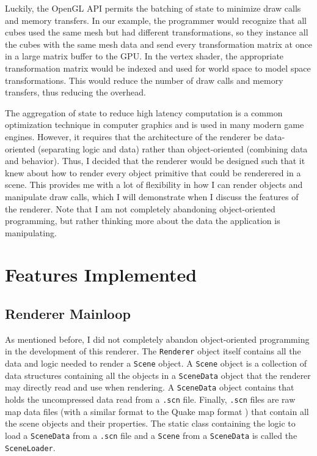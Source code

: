 \documentclass[letterpaper, 10 pt, conference]{ieeeconf}  %
\begin{document}
Luckily, the OpenGL API permits the batching of state to minimize draw calls and memory transfers. In our example, the programmer would recognize that all cubes used the same mesh but had different transformations, so they instance all the cubes with the same mesh data and send every transformation matrix at once in a large matrix buffer to the GPU. In the vertex shader, the appropriate transformation matrix would be indexed and used for world space to model space transformations. This would reduce the number of draw calls and memory transfers, thus reducing the overhead.

The aggregation of state to reduce high latency computation is a common optimization technique in computer graphics and is used in many modern game engines. However, it requires that the architecture of the renderer be data-oriented (separating logic and data) rather than object-oriented (combining data and behavior). Thus, I decided that the renderer would be designed such that it knew about how to render every object primitive that could be renderered in a scene. This provides me with a lot of flexibility in how I can render objects and manipulate draw calls, which I will demonstrate when I discuss the features of the renderer. Note that I am not completely abandoning object-oriented programming, but rather thinking more about the data the application is manipulating. 


\section{Features Implemented}

\subsection {Renderer Mainloop}
As mentioned before, I did not completely abandon object-oriented programming in the development of this renderer. The \texttt{Renderer} object itself contains all the data and logic needed to render a \texttt{Scene} object. A \texttt{Scene} object is a collection of data structures containing all the objects in a \texttt{SceneData} object that the renderer may directly read and use when rendering. A \texttt{SceneData} object contains that holds the uncompressed data read from a \texttt{.scn} file. Finally, \texttt{.scn} files are raw map data files (with a similar format to the Quake map format \cite{quake}) that contain all the scene objects and their properties. The static class containing the logic to load a \texttt{SceneData} from a \texttt{.scn} file and a \texttt{Scene} from a \texttt{SceneData} is called the \texttt{SceneLoader}.
\end{document}
